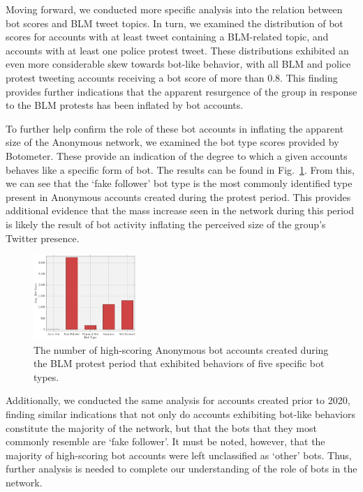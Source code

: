 \documentclass[letterpaper]{article}
\begin{document}
Moving forward, we conducted more specific analysis into the relation between bot scores and BLM tweet topics. In turn, we examined the distribution of bot scores for accounts with at least tweet containing a BLM-related topic, and accounts with at least one police protest tweet. These distributions exhibited an even more considerable skew towards bot-like behavior, with all BLM and police protest tweeting accounts receiving a bot score of more than 0.8. This finding provides further indications that the apparent resurgence of the group in response to the BLM protests has been inflated by bot accounts.

To further help confirm the role of these bot accounts in inflating the apparent size of the Anonymous network, we examined the bot type scores provided by Botometer. These provide an indication of the degree to which a given accounts behaves like a specific form of bot. The results can be found in Fig.~\ref{fig:botTypes}. From this, we can see that the `fake follower' bot type is the most commonly identified type present in Anonymous accounts created during the protest period. This provides additional evidence that the mass increase seen in the network during this period is likely the result of bot activity inflating the perceived size of the group's Twitter presence.

\begin{figure}[!ht]
\centering
\includegraphics[width=0.54\linewidth,height=1.27in ]{bot_types.pdf}
\caption{The number of high-scoring Anonymous bot accounts created during the BLM protest period that exhibited behaviors of five specific bot types.}
\label{fig:botTypes}
\end{figure}

\vspace{-1.07mm}
\vspace{-1.48mm}
Additionally, we conducted the same analysis for accounts created prior to 2020, finding similar indications that not only do accounts exhibiting bot-like behaviors constitute the majority of the network, but that the bots that they most commonly resemble are `fake follower'. It must be noted, however, that the majority of high-scoring bot accounts were left unclassified as `other' bots. Thus, further analysis is needed to complete our understanding of the role of bots in the network.
\end{document}
